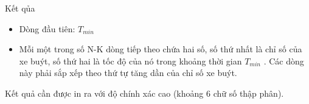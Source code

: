 Kết qủa  
\begin{itemize}
	\item     Dòng đầu tiên: $T_{min}$
	\item     Mỗi một trong số N-K dòng tiếp theo chứa hai số, số thứ nhất là chỉ số của xe buýt, số thứ hai là tốc độ của nó trong khoảng thời gian   $T_{min}$    . Các dòng này phải sắp xếp theo thứ tự tăng dần của chỉ số xe buýt.   
\end{itemize}

   Kết quả cần được in ra với độ chính xác cao (khoảng 6 chữ số thập phân).
